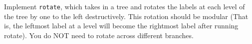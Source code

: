\begin{blocksection}
\question Implement \texttt{rotate}, which takes in a tree and rotates the labels at each level of the tree by one to the left destructively. This rotation should be modular (That is, the leftmost label at a level will become the rightmost label after running rotate). You do NOT need to rotate across different branches.

\begin{comment}
For example, given the following tree,\texttt{t}

\begin{tikzpicture}[scale=1, transform shape]
\tikzstyle{level 2}=[sibling distance=10mm]
    \node [circle, draw] (z){$1$}
        child {node [circle, draw] (a) {$2$}}
        child {node [circle, draw] (d) {$3$}
            child {node [circle, draw] (g) {$4$}}
        }
        child {node [circle, draw] (b) {$5$}};
\end{tikzpicture}

calling rotate on \texttt{t} should mutate it to give us 

\begin{tikzpicture}[scale=1, transform shape]
\tikzstyle{level 2}=[sibling distance=10mm]
    \node [circle, draw] (z){$1$}
        child {node [circle, draw] (a) {$3$}}
        child {node [circle, draw] (d) {$5$}
            child {node [circle, draw] (g) {$4$}}
        }
        child {node [circle, draw] (b) {$2$}};
\end{tikzpicture}

Fill in your implementation on the next page.
\end{comment}
\end{blocksection}

